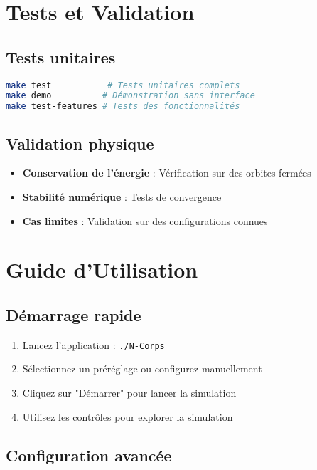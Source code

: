 \documentclass[12pt,a4paper]{article}
\begin{document}
\section{Tests et Validation}

\subsection{Tests unitaires}

\begin{lstlisting}[language=bash, caption=Exécution des tests]
make test           # Tests unitaires complets
make demo          # Démonstration sans interface
make test-features # Tests des fonctionnalités
\end{lstlisting}

\subsection{Validation physique}

\begin{itemize}
    \item \textbf{Conservation de l'énergie} : Vérification sur des orbites fermées
    \item \textbf{Stabilité numérique} : Tests de convergence
    \item \textbf{Cas limites} : Validation sur des configurations connues
\end{itemize}

\section{Guide d'Utilisation}

\subsection{Démarrage rapide}

\begin{enumerate}
    \item Lancez l'application : \texttt{./N-Corps}
    \item Sélectionnez un préréglage ou configurez manuellement
    \item Cliquez sur "Démarrer" pour lancer la simulation
    \item Utilisez les contrôles pour explorer la simulation
\end{enumerate}

\subsection{Configuration avancée}
\end{document}
